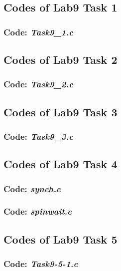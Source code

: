 \subsection*{Codes of Lab9 Task 1}
\subsubsection*{Code: \textit{Task9\_1.c}}

\newpage

\subsection*{Codes of Lab9 Task 2}
\subsubsection*{Code: \textit{Task9\_2.c}}

\newpage

\subsection*{Codes of Lab9 Task 3}
\subsubsection*{Code: \textit{Task9\_3.c}}

\newpage

\subsection*{Codes of Lab9 Task 4}
\subsubsection*{Code: \textit{synch.c}}

\newpage

\subsubsection*{Code: \textit{spinwait.c}}

\newpage

\subsection*{Codes of Lab9 Task 5}
\subsubsection*{Code: \textit{Task9-5-1.c}}

\newpage

